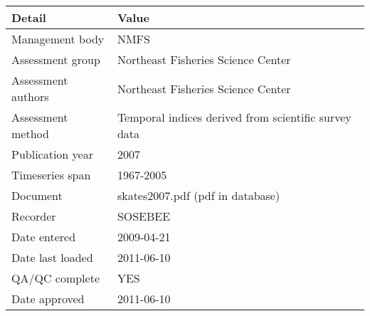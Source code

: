 \begin{table}[htb]
\centering
\begin{tabular}{lp{7cm}}
\toprule
Detail & Value \\
\midrule
Management body    & NMFS                                                 \\
Assessment group   & Northeast Fisheries Science Center                   \\
Assessment authors & Northeast Fisheries Science Center                   \\
Assessment method  & Temporal indices derived from scientific survey data \\
Publication year   & 2007                                                 \\
Timeseries span    & 1967-2005                                            \\
Document           & skates2007.pdf (pdf in database)                     \\
Recorder           & SOSEBEE                                              \\
Date entered       & 2009-04-21                                           \\
Date last loaded   & 2011-06-10                                           \\
QA/QC complete     & YES                                                  \\
Date approved      & 2011-06-10                                           \\
\bottomrule
\end{tabular}
\label{tab:assessdet}
\end{table}
